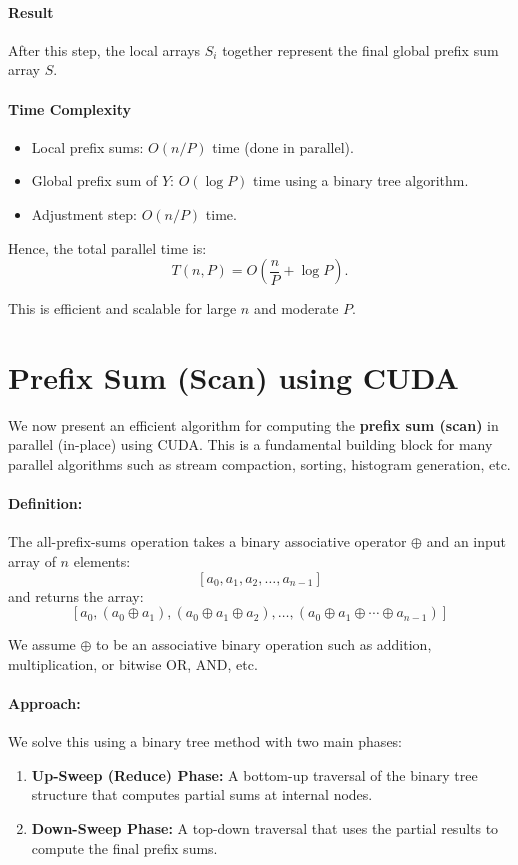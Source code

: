 \documentclass[12pt]{book}
\begin{document}
\paragraph{Result}
After this step, the local arrays $S_i$ together represent the final global prefix sum array $S$.

\paragraph{Time Complexity}
\begin{itemize}
    \item Local prefix sums: $O(n/P)$ time (done in parallel).
    \item Global prefix sum of $Y$: $O(\log P)$ time using a binary tree algorithm.
    \item Adjustment step: $O(n/P)$ time.
\end{itemize}

Hence, the total parallel time is:
\[
T(n, P) = O\left(\frac{n}{P} + \log P\right).
\]

This is efficient and scalable for large $n$ and moderate $P$.

\section{Prefix Sum (Scan) using CUDA}

We now present an efficient algorithm for computing the \textbf{prefix sum (scan)} in parallel (in-place) using CUDA. This is a fundamental building block for many parallel algorithms such as stream compaction, sorting, histogram generation, etc.

\paragraph{Definition:}
The all-prefix-sums operation takes a binary associative operator $\oplus$ and an input array of $n$ elements:
\[
[a_0, a_1, a_2, \ldots, a_{n-1}]
\]
and returns the array:
\[
[a_0, (a_0 \oplus a_1), (a_0 \oplus a_1 \oplus a_2), \ldots, (a_0 \oplus a_1 \oplus \cdots \oplus a_{n-1})]
\]

We assume $\oplus$ to be an associative binary operation such as addition, multiplication, or bitwise OR, AND, etc.

\paragraph{Approach:} 
We solve this using a binary tree method with two main phases:
\begin{enumerate}
    \item \textbf{Up-Sweep (Reduce) Phase:} A bottom-up traversal of the binary tree structure that computes partial sums at internal nodes.
    \item \textbf{Down-Sweep Phase:} A top-down traversal that uses the partial results to compute the final prefix sums.
\end{enumerate}
\end{document}
